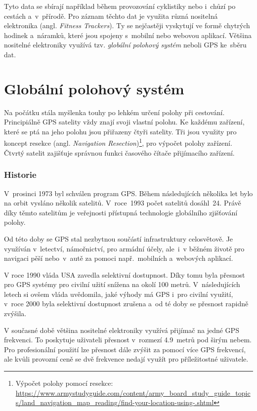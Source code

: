 Tyto data se sbírají například během provozování cyklistiky nebo i~chůzí po cestách a~v~přírodě. Pro záznam těchto dat je využita různá nositelná elektronika (angl. \emph{Fitness Trackers}). Ty se nejčastěji vyskytují ve formě chytrých hodinek a~náramků, které jsou spojeny s~mobilní nebo webovou aplikací. Většina nositelné elektroniky využívá tzv. \emph{globální polohový systém} neboli GPS ke~sběru dat. \cite{trackers}
\section{Globální polohový systém}
Na počátku stála myšlenka touhy po lehkém určení polohy při cestování. Principiálně GPS satelity vždy znají svoji vlastní polohu. Ke každému zařízení, které se ptá na jeho polohu jsou přiřazeny čtyři satelity. Tři jsou využity pro koncept resekce (angl. \emph{Navigation Resection})\footnote{Výpočet polohy pomocí resekce: \url{https://www.armystudyguide.com/content/army_board_study_guide_topics/land_navigation_map_reading/find-your-location-using-.shtml}}, pro výpočet polohy zařízení. Čtvrtý satelit zajišťuje správnou funkci časového čítače přijímacího zařízení. \cite{gps3} 

\subsubsection*{Historie}
V~prosinci 1973 byl schválen program GPS. Během následujících několika let bylo na orbit vysláno několik satelitů. V~roce~1993 počet satelitů dosáhl~24. Právě díky těmto satelitům je veřejnosti přístupná technologie globálního zjišťování polohy. \cite{gps1}

Od této doby se GPS stal nezbytnou součástí infrastruktury celosvětově. Je využíván v~letectví, námořnictví, pro armádní účely, ale~i~v běžném životě pro navigaci pěší nebo~v~autě za pomoci např.~mobilních a~webových aplikací. \cite{gps2}

V roce 1990 vláda USA zavedla selektivní dostupnost. Díky tomu byla přesnost pro GPS systémy pro civilní užití snížena na okolí 100 metrů. V~následujících letech si ovšem vláda uvědomila, jaké výhody má GPS i~pro civilní využití, v~roce 2000 byla selektivní dostupnost zrušena a~od té doby se přesnost rapidně zvýšila. \cite{gpsacc2}

V současné době většina nositelné elektroniky využívá přijímač na jedné GPS frekvenci. To poskytuje uživateli přesnost v~rozmezí 4.9~metrů pod širým nebem. Pro profesionální použití lze přesnost dále zvýšit za pomocí více GPS frekvencí, ale kvůli provozní ceně se dvě frekvence nedají využít pro příležitostné uživatele.  \cite{gpsacc1}

